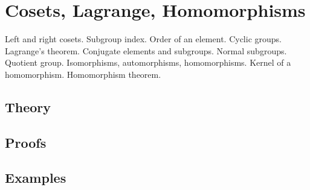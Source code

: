 
\section{Cosets, Lagrange, Homomorphisms}
\label{sec:2.2.12-cosets-quotients}

\begin{ticket}
Left and right cosets. Subgroup index. Order of an element. Cyclic groups. Lagrange's theorem. Conjugate elements and subgroups. Normal subgroups. Quotient group. Isomorphisms, automorphisms, homomorphisms. Kernel of a homomorphism. Homomorphism theorem.
\end{ticket}

\subsection*{Theory}

\subsection*{Proofs}

\subsection*{Examples}
